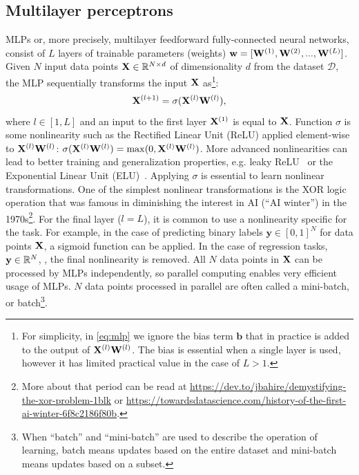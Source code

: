 \subsection{Multilayer perceptrons\label{sec:bg_mlp}}
MLPs or, more precisely, multilayer feedforward fully-connected neural networks, consist of $L$ layers of trainable parameters (weights) $\mathbf{w} = [\mathbf{W}^{(1)}, \mathbf{W}^{(2)}, ..., \mathbf{W}^{(L)}]$. Given $N$ input data points $\mathbf{X} \in \mathbb{R}^{N \times d} $ of dimensionality $d$ from the dataset $\mathcal{D}$, the MLP sequentially transforms the input $\mathbf{X}$ as\footnote{For simplicity, in \eqref{eq:mlp} we ignore the bias term $\mathbf{b}$ that in practice is added to the output of $\mathbf{X}^{(l)}\mathbf{W}^{(l)}$. The bias is essential when a single layer is used, however it has limited practical value in the case of $L > 1$.}:
%
\begin{equation}
    \label{eq:mlp}
    \mathbf{X}^{(l+1)} = \sigma(\mathbf{X}^{(l)}\mathbf{W}^{(l)}),
\end{equation}
%
\noindent where $l \in [1,L]$ and an input to the first layer $\mathbf{X}^{(1)}$ is equal to $\mathbf{X}$. Function $\sigma$ is some nonlinearity such as the Rectified Linear Unit (ReLU) applied element-wise to $\mathbf{X}^{(l)}\mathbf{W}^{(l)}$: $\sigma (\mathbf{X}^{(l)}\mathbf{W}^{(l)})=\max(0, \mathbf{X}^{(l)}\mathbf{W}^{(l)})$. More advanced nonlinearities can lead to better training and generalization properties, e.g. leaky ReLU~\citep{maas2013rectifier} or the Exponential Linear Unit (ELU)~\citep{clevert2015fast}. Applying $\sigma$ is essential to learn nonlinear transformations. One of the simplest nonlinear transformations is the XOR logic operation that was famous in diminishing the interest in AI (``AI winter'') in the 1970s\footnote{More about that period can be read at \url{https://dev.to/jbahire/demystifying-the-xor-problem-1blk} or \url{https://towardsdatascience.com/history-of-the-first-ai-winter-6f8c2186f80b}.}. For the final layer ($l=L$), it is common to use a nonlinearity specific for the task. For example, in the case of predicting binary labels $\mathbf{y} \in [0,1]^N$ for data points $\mathbf{X}$, a sigmoid function can be applied. In the case of regression tasks, $\mathbf{y} \in \mathbb{R}^N$, \ie, the final nonlinearity is removed.
All $N$ data points in $\mathbf{X}$ can be processed by MLPs independently, so parallel computing enables very efficient usage of MLPs. $N$ data points processed in parallel are often called a mini-batch, or batch\footnote{When ``batch'' and ``mini-batch'' are used to describe the operation of learning, batch means updates based on the entire dataset and mini-batch means updates based on a subset.}.
